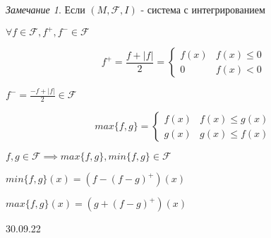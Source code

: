 \documentclass[a4paper, 12pt]{article}
\theoremstyle{definition}
\theoremstyle{remark}
\newtheorem*{remark}{Замечание}
\begin{document}
\begin{remark}
     Если $(M, \mathcal{F} , I)$ - система с интегрированием

     $\forall f\in \mathcal{F}, f^{+}, f^{-}\in \mathcal{F} $
     
     \begin{equation*}
          \text{$f^+ = \frac{f+|f|}{2} = $}
           \begin{cases}
             f(x) &\text{$f(x)\leq 0$} \\
             0 &\text{$f(x)< 0$}
           \end{cases}
     \end{equation*}

     $f^- = \frac{-f+|f|}{2} \in \mathcal{F}$

     \begin{equation*}
          \text{$max\{f, g\} = $}
           \begin{cases}
             f(x) &\text{$f(x)\leq g(x)$} \\
             g(x) &\text{$g(x)\leq f(x)$}
           \end{cases}
     \end{equation*}

     $f, g\in\mathcal{F} \implies max\{f, g\}, min\{f, g\}\in \mathcal{F} $

     $min\{f, g\}(x) = (f - (f-g)^+)(x)$

     $max\{f, g\}(x) = (g+(f-g)^+)(x)$
\end{remark}
30.09.22
\end{document}
